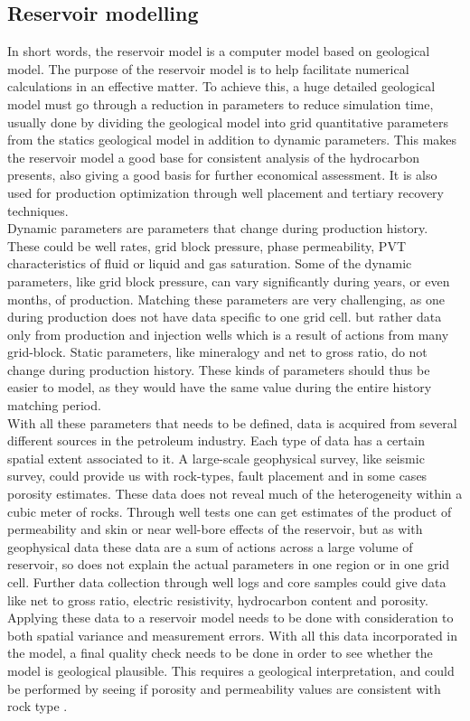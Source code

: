 \documentclass[12pt,a4paper]{report}
\begin{document}
\subsection{Reservoir modelling \cite{His1}}
In short words, the reservoir model is a computer model based on geological model. The purpose of the reservoir model is to help facilitate numerical calculations in an effective matter. To achieve this, a huge detailed geological model must go through a reduction in parameters to reduce simulation time, usually done by dividing the geological model into grid quantitative parameters from the statics geological model in addition to dynamic parameters. This makes the reservoir model a good base for consistent analysis of the hydrocarbon presents, also giving a good basis for further economical assessment. It is also used for production optimization through well placement and tertiary recovery techniques.\\
Dynamic parameters are parameters that change during production history. These could be well rates, grid block pressure, phase permeability, PVT characteristics of fluid or liquid and gas saturation. Some of the dynamic parameters, like grid block pressure, can vary significantly during years, or even months, of production. Matching these parameters are very challenging, as one during production does not have data specific to one grid cell. but rather data only from production and injection wells which is a result of actions from many grid-block. Static parameters, like mineralogy and net to gross ratio, do not change during production history. These kinds of parameters should thus be easier to model, as they would have the same value during the entire history matching period.\\
With all these parameters that needs to be defined, data is acquired from several different sources in the petroleum industry. Each type of data has a certain spatial extent associated to it. A large-scale geophysical survey, like seismic survey, could provide us with rock-types, fault placement and in some cases porosity estimates. These data does not reveal much of the heterogeneity within a cubic meter of rocks. Through well tests one can get estimates of the product of permeability and skin or near well-bore effects of the reservoir, but as with geophysical data these data are a sum of actions across a large volume of reservoir, so does not explain the actual parameters in one region or in one grid cell. Further data collection through well logs and core samples could give data like net to gross ratio, electric resistivity, hydrocarbon content and porosity. Applying these data to a reservoir model needs to be done with consideration to both spatial variance and measurement errors. With all this data incorporated in the model, a final quality check needs to be done in order to see whether the model is geological plausible. This requires a geological interpretation, and could be performed by seeing if porosity and permeability values are consistent with rock type \cite{His2}. \\
\end{document}
